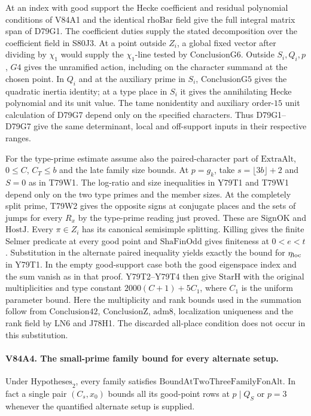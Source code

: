 At an index with good support the Hecke coefficient and residual
polynomial conditions of V84A1 and the identical $\mathrm{rhoBar}$
field give the full integral matrix span of D79G1. The coefficient
duties supply the stated decomposition over the coefficient field
in S80J3. At a point outside $Z_i$, a global fixed vector after
dividing by $\chi_1$ would supply the $\chi_1$-line tested by
$\mathrm{ConclusionG6}$. Outside $S_i,Q_i,p$, $G4$ gives the
unramified action, including on the character summand at the
chosen point. In $Q_i$ and at the auxiliary prime in $S_i$,
$\mathrm{ConclusionG5}$ gives the quadratic inertia identity;
at a type place in $S_i$ it gives the annihilating Hecke
polynomial and its unit value. The tame nonidentity and auxiliary
order-$15$ unit calculation of D79G7 depend only on the specified
characters. Thus D79G1--D79G7 give the same determinant, local
and off-support inputs in their respective ranges.

For the type-prime estimate assume also the paired-character
part of $\mathrm{ExtraAlt}$, $0\le C$, $C_T\le b$ and the late
family size bounds. At $p=g_k$, take $s=\lfloor3b\rfloor+2$ and
$S=0$ as in T79W1. The log-ratio and size inequalities in Y79T1
and T79W1 depend only on the two type primes and the member
sizes. At the completely split prime, T79W2 gives the opposite
signs at conjugate places and the sets of jumps for every $R_x$
by the type-prime reading just proved. These are
$\mathrm{SignOK}$ and $\mathrm{HostJ}$. Every $\pi\in Z_i$ has
its canonical semisimple splitting. Killing gives the finite
Selmer predicate at every good point and $\mathrm{ShaFinOdd}$
gives finiteness at $0<e<t$. Substitution in the alternate paired
inequality yields exactly the bound for $\eta_{\rm loc}$ in Y79T1.
In the empty good-support case both the good eigenspace index
and the sum vanish as in that proof. Y79T2--Y79T4 then give
$\mathrm{StarH}$ with the original multiplicities and type
constant $2000(C+1)+5C_1$, where $C_1$ is the uniform parameter
bound. Here the multiplicity and rank bounds used in the summation
follow from $\mathrm{Conclusion42}$, $\mathrm{ConclusionZ}$,
$\mathrm{adm8}$, localization uniqueness and the rank field by LN6
and J78H1. The discarded all-place condition does not occur in
this substitution.

\paragraph{V84A4. The small-prime family bound for every alternate setup.}
Under $\mathrm{Hypotheses}_2$, every family satisfies
$\mathrm{BoundAtTwoThreeFamilyFonAlt}$. In fact a single pair
$(C_s,x_0)$ bounds all its good-point rows at $p\mid Q_S$ or
$p=3$ whenever the quantified alternate setup is supplied.

